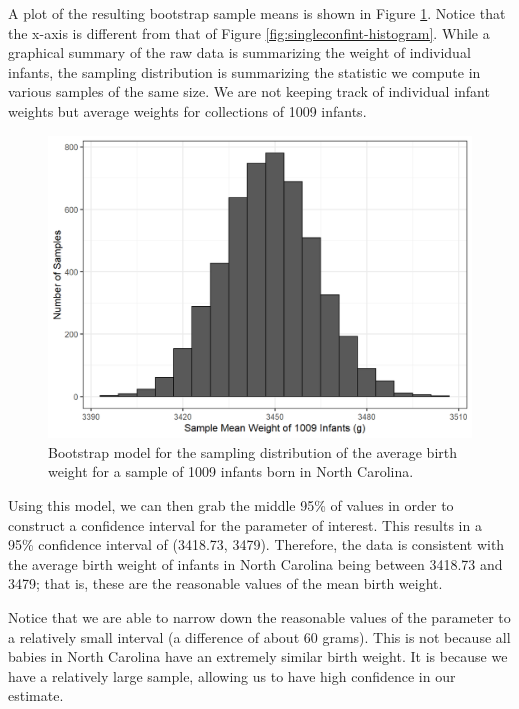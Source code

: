 \documentclass[
]{book}
\theoremstyle{plain}
\theoremstyle{mydefn}
\theoremstyle{myexmpl}
\theoremstyle{remark}
\begin{document}
A plot of the resulting bootstrap sample means is shown in Figure \ref{fig:singleconfint-samp-distn}. Notice that the x-axis is different from that of Figure \ref{fig:singleconfint-histogram}. While a graphical summary of the raw data is summarizing the weight of individual infants, the sampling distribution is summarizing the statistic we compute in various samples of the same size. We are not keeping track of individual infant weights but average weights for collections of 1009 infants.

\begin{figure}

{\centering \includegraphics[width=0.8\linewidth]{./Images/singleconfint-samp-distn-1} 

}

\caption{Bootstrap model for the sampling distribution of the average birth weight for a sample of 1009 infants born in North Carolina.}\label{fig:singleconfint-samp-distn}
\end{figure}

Using this model, we can then grab the middle 95\% of values in order to construct a confidence interval for the parameter of interest. This results in a 95\% confidence interval of (3418.73, 3479). Therefore, the data is consistent with the average birth weight of infants in North Carolina being between 3418.73 and 3479; that is, these are the reasonable values of the mean birth weight.

Notice that we are able to narrow down the reasonable values of the parameter to a relatively small interval (a difference of about 60 grams). This is not because all babies in North Carolina have an extremely similar birth weight. It is because we have a relatively large sample, allowing us to have high confidence in our estimate.
\end{document}
